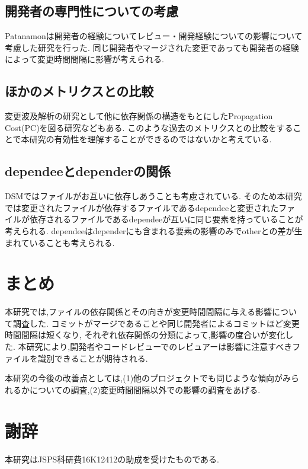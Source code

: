 \documentclass{fose2016}           %
\begin{document}
\subsection*{開発者の専門性についての考慮}
Patanamonは開発者の経験についてレビュー・開発経験についての影響について考慮した研究を行った\cite{Patanamon2}.
同じ開発者やマージされた変更であっても開発者の経験によって変更時間間隔に影響が考えられる.

\subsection*{ほかのメトリクスとの比較}
変更波及解析の研究として他に依存関係の構造をもとにしたPropagation Cost(PC)を図る研究などもある\cite{Nord}.
このような過去のメトリクスとの比較をすることで本研究の有効性を理解することができるのではないかと考えている.

\subsection*{dependeeとdependerの関係}
DSMではファイルがお互いに依存しあうことも考慮されている.
そのため本研究では変更されたファイルが依存するファイルであるdependeeと変更されたファイルが依存されるファイルであるdependeeが互いに同じ要素を持っていることが考えられる.
dependeeはdependerにも含まれる要素の影響のみでotherとの差が生まれていることも考えられる.

\section{まとめ} \label{まとめ}
本研究では,ファイルの依存関係とその向きが変更時間間隔に与える影響について調査した.
コミットがマージであることや同じ開発者によるコミットほど変更時間間隔は短くなり,
それぞれ依存関係の分類によって,影響の度合いが変化した.
本研究により,開発者やコードレビューでのレビュアーは影響に注意すべきファイルを識別できることが期待される.

本研究の今後の改善点としては,(1)他のプロジェクトでも同じような傾向がみられるかについての調査,(2)変更時間間隔以外での影響の調査をあげる.

\section*{謝辞}
本研究はJSPS科研費16K12412の助成を受けたものである.
\end{document}
